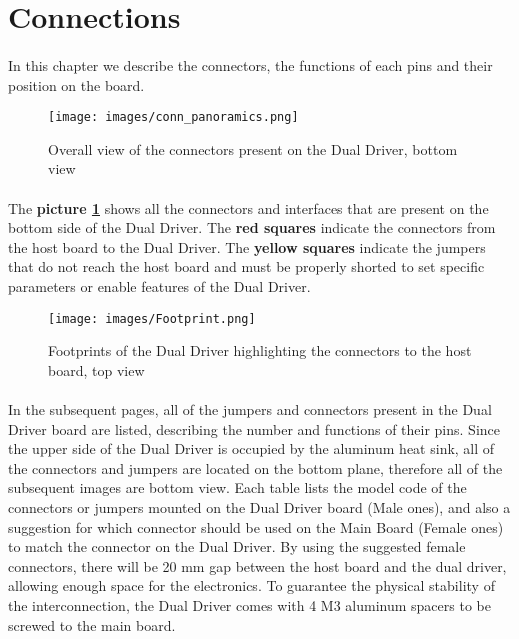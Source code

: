 \newpage
\section{ Connections }
\paragraph{} In this chapter we describe the connectors, the functions of each pins and their position on the board. \newline

\begin{figure}[h]
    \centering
    \texttt{[image: images/conn\_panoramics.png]}
    \caption{Overall view of the connectors present on the Dual Driver, bottom view}
    \label{overall_conn_view}
\end{figure}

\paragraph{} The \textbf{picture \ref{overall_conn_view}} shows all the connectors and interfaces that are present on the bottom side of the Dual Driver. \newline
The \textbf{red squares} indicate the connectors from the host board to the Dual Driver. \newline
The \textbf{yellow squares} indicate the jumpers that do not reach the host board and must be properly shorted to set specific parameters or enable features of the Dual Driver.

\begin{figure}[h]
    \centering
    \texttt{[image: images/Footprint.png]}
    \caption{Footprints of the Dual Driver highlighting the connectors to the host board, top view}
    \label{footprint}
\end{figure}

\paragraph{} In the subsequent pages, all of the jumpers and connectors present in the Dual Driver board are listed, describing the number and functions of their pins. \newline
Since the upper side of the Dual Driver is occupied by the aluminum heat sink, all of the connectors and jumpers are located on the bottom plane, therefore all of the subsequent images are bottom view. \newline
Each table lists the model code of the connectors or jumpers mounted on the Dual Driver board (Male ones), and also a suggestion for which connector should be used on the Main Board (Female ones) to match the connector on the Dual Driver. \newline
By using the suggested female connectors, there will be 20 mm gap between the host board and the dual driver, allowing enough space for the electronics. \newline
To guarantee the physical stability of the interconnection, the Dual Driver comes with 4 M3 aluminum spacers to be screwed to the main board.
\newpage



